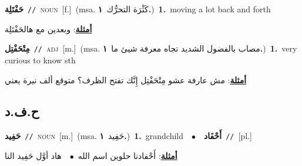 \documentclass[10pt,a4paper,twoside]{article} %
\begin{document}
\begin{multicols}{2}
{\setlength\topsep{0pt}\textbf{\foreignlanguage{arabic}{حَفْتَلِة}}\ {\color{gray}\texttt{//}\color{black}}\ \textsc{noun}\ [f.]\ \color{gray}(msa. \foreignlanguage{arabic}{كَثْرَة التحرُّك}~\foreignlanguage{arabic}{\textbf{١.}})\color{black}\ \textbf{1.}~moving a lot back and forth\  \begin{flushright}\color{gray}\foreignlanguage{arabic}{\textbf{\underline{\foreignlanguage{arabic}{أمثلة}}}: وبعدين مع هالحَفْتَلِة}\end{flushright}\color{black}} \vspace{2mm}

{\setlength\topsep{0pt}\textbf{\foreignlanguage{arabic}{مِتْحَفْتِل}}\ {\color{gray}\texttt{//}\color{black}}\ \textsc{adj}\ [m.]\ \color{gray}(msa. \foreignlanguage{arabic}{مصاب بالفضول الشديد تجاه معرفة شيئ ما}~\foreignlanguage{arabic}{\textbf{١.}})\color{black}\ \textbf{1.}~very curious to know sth\  \begin{flushright}\color{gray}\foreignlanguage{arabic}{\textbf{\underline{\foreignlanguage{arabic}{أمثلة}}}: مش عارفة عشو مِتْحَفْتِل إِنَّك تفتح الظرف؟ متوقع ألف نيرة يعني}\end{flushright}\color{black}} \vspace{2mm}

\vspace{-3mm}
\subsection*{\color{blue}\foreignlanguage{arabic}{ح.ف.د}\color{blue}{}} 

{\setlength\topsep{0pt}\textbf{\foreignlanguage{arabic}{حَفِيد}}\ {\color{gray}\texttt{//}\color{black}}\ \textsc{noun}\ [m.]\ \color{gray}(msa. \foreignlanguage{arabic}{حَفِيد}~\foreignlanguage{arabic}{\textbf{١.}})\color{black}\ \textbf{1.}~grandchild\ \ $\bullet$\ \ \setlength\topsep{0pt}\textbf{\foreignlanguage{arabic}{أَحْفَاد}}\ {\color{gray}\texttt{//}\color{black}}\ [pl.]\  \begin{flushright}\color{gray}\foreignlanguage{arabic}{\textbf{\underline{\foreignlanguage{arabic}{أمثلة}}}: أَحْفادنا حلوين اسم الله\ $\bullet$\ \  هاد أوَّل حَفِيد النا}\end{flushright}\color{black}} \vspace{2mm}


\end{multicols}
\end{document}
